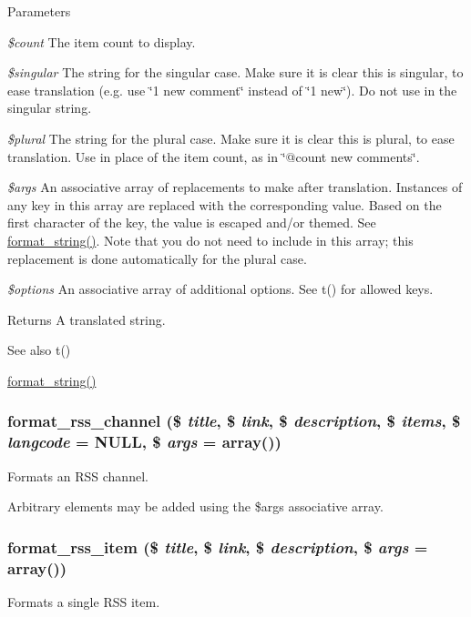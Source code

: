 \begin{DoxyParams}{Parameters}
\item[{\em \$count}]The item count to display. \item[{\em \$singular}]The string for the singular case. Make sure it is clear this is singular, to ease translation (e.g. use \char`\"{}1 new comment\char`\"{} instead of \char`\"{}1 new\char`\"{}). Do not use  in the singular string. \item[{\em \$plural}]The string for the plural case. Make sure it is clear this is plural, to ease translation. Use  in place of the item count, as in \char`\"{}@count new comments\char`\"{}. \item[{\em \$args}]An associative array of replacements to make after translation. Instances of any key in this array are replaced with the corresponding value. Based on the first character of the key, the value is escaped and/or themed. See \hyperlink{group__sanitization_ga8da272cf93fb6ba229eca7c0b06ea4d2}{format\_\-string()}. Note that you do not need to include  in this array; this replacement is done automatically for the plural case. \item[{\em \$options}]An associative array of additional options. See t() for allowed keys.\end{DoxyParams}
\begin{DoxyReturn}{Returns}
A translated string.
\end{DoxyReturn}
\begin{DoxySeeAlso}{See also}
t() 

\hyperlink{group__sanitization_ga8da272cf93fb6ba229eca7c0b06ea4d2}{format\_\-string()} 
\end{DoxySeeAlso}
\hypertarget{group__format_ga44992b971aed4a6a5b8457678f57de50}{
\subsubsection[{format\_\-rss\_\-channel}]{\setlength{\rightskip}{0pt plus 5cm}format\_\-rss\_\-channel (\$ {\em title}, \/  \$ {\em link}, \/  \$ {\em description}, \/  \$ {\em items}, \/  \$ {\em langcode} = {\ttfamily NULL}, \/  \$ {\em args} = {\ttfamily array()})}}
\label{group__format_ga44992b971aed4a6a5b8457678f57de50}
Formats an RSS channel.

Arbitrary elements may be added using the \$args associative array. \hypertarget{group__format_ga4ecc9b876a9eaa65abb24ef513b217ad}{
\subsubsection[{format\_\-rss\_\-item}]{\setlength{\rightskip}{0pt plus 5cm}format\_\-rss\_\-item (\$ {\em title}, \/  \$ {\em link}, \/  \$ {\em description}, \/  \$ {\em args} = {\ttfamily array()})}}
\label{group__format_ga4ecc9b876a9eaa65abb24ef513b217ad}
Formats a single RSS item.

